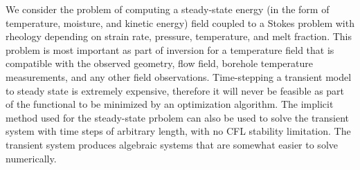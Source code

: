 We consider the problem of computing a steady-state energy (in the form of temperature, moisture, and kinetic energy) field coupled to a Stokes problem with rheology depending on strain rate, pressure, temperature, and melt fraction.
This problem is most important as part of inversion for a temperature field that is compatible with the observed geometry, flow field, borehole temperature measurements, and any other field observations.
Time-stepping a transient model to steady state is extremely expensive, therefore it will never be feasible as part of the functional to be minimized by an optimization algorithm.
The implicit method used for the steady-state prbolem can also be used to solve the transient system with time steps of arbitrary length, with no CFL stability limitation.
The transient system produces algebraic systems that are somewhat easier to solve numerically.

